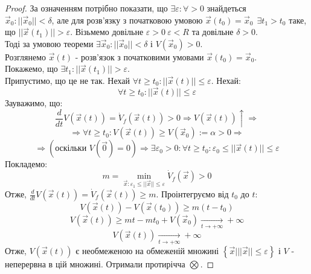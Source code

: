 \begin{proof}
 За означенням потрібно показати, що $\exists \varepsilon : \forall > 0 $ знайдеться\\
 $\overrightarrow{x}_0 : ||\overrightarrow{x}_0|| < \delta$, але для розв'язку з початковою умовою $\overrightarrow{x}(t_0) = \overrightarrow{x}_0 \ \ \exists t_1 > t_0 $ таке, що $||\overrightarrow{x} (t_1)||>\varepsilon $.
 Візьмемо довільне $ \varepsilon > 0 \ \varepsilon  < R  $ та довільне $\delta > 0$. \\
 Тоді за умовою теореми $\exists \overrightarrow{x}_0 : ||\overrightarrow{x}_0|| < \delta $ і $V(\overrightarrow{x}_0) > 0$.\\
Розглянемо $\overrightarrow{x}(t)$ - розв'язок з початковими умовами $\overrightarrow{x}(t_0) = \overrightarrow{x}_0$.\\
Покажемо, що $\exists t_1 : ||\overrightarrow{x}(t_1)|| > \varepsilon $. \\
Припустимо, що це не так. Нехай $\forall t \geq t_0 : ||\overrightarrow{x}(t)|| \leq \varepsilon $. Нехай:\\
$$
\forall t \geq t_0 : ||\overrightarrow{x}(t)|| \leq \varepsilon
$$
Зауважимо, що:
$$
\frac{d}{dt} V(\overrightarrow{x}(t)) = \dot{V}_f (\overrightarrow{x}(t)) >0 \Longrightarrow V(\overrightarrow{x}(t)) \! \uparrow \Longrightarrow
$$
$$
\Longrightarrow \forall t \geq t_0 : V(\overrightarrow{x}(t)) \geq  V(\overrightarrow{x}_0) := \alpha > 0 \Longrightarrow
$$
$$
\Longrightarrow (\text{оскільки } V(\overrightarrow{0}) = 0) \Longrightarrow \exists \varepsilon_0 >0 : \forall t \geq t_0 : \varepsilon _0 \leq ||\overrightarrow{x}(t)|| \leq \varepsilon
$$
Покладемо:
$$
m = \min\limits_{\overrightarrow{x} : \varepsilon_1 \leq ||\overrightarrow{x}|| \leq \varepsilon } \dot{V}_f(\overrightarrow{x}) > 0
$$
Отже, $ \frac{d}{dt}V(\overrightarrow{x}(t))  = \dot{V}_f(\overrightarrow{x}(t)) \geq m $. Проінтегруємо від $t_0$ до $t$:
$$
V(\overrightarrow{x}(t)) - V(\overrightarrow{x}(t_0)) \geq m (t -t_0)
$$
$$
V(\overrightarrow{x}(t)) \geq  mt - mt_0 + V(\overrightarrow{x}_0) \xrightarrow[t\to+\infty]{}+ \infty
$$
$$
V(\overrightarrow{x}(t)) \xrightarrow[t\to+\infty]{} + \infty
$$
Отже, $V(\overrightarrow{x}(t))$ є необмеженою на обмеженій множині $\left\lbrace \overrightarrow{x} \Big| ||\overrightarrow{x}|| \leq \varepsilon  \right\rbrace$ і $V$ - неперервна в цій множині.
Отримали протирічча $\bigotimes$.
\end{proof}

